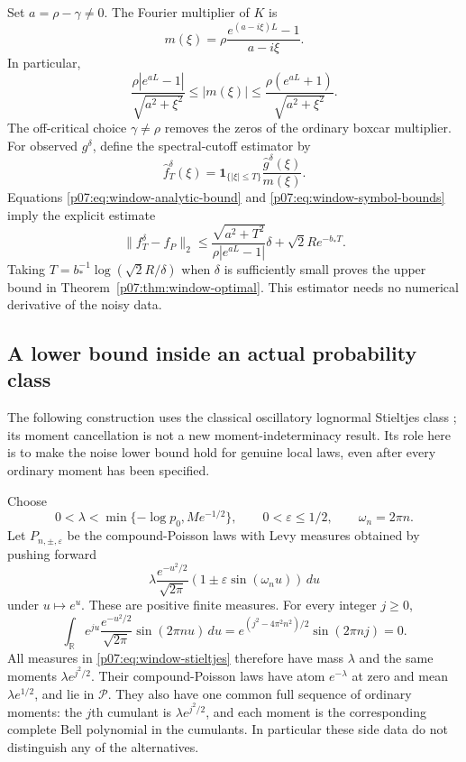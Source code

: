 \documentclass[11pt,letterpaper]{article}
\theoremstyle{definition}
\theoremstyle{remark}
\newcommand{\1}{\mathbf 1}
\begin{document}
Set $a=\rho-\gamma\ne0$.  The Fourier multiplier of $K$ is
\begin{equation}\label{p07:eq:window-symbol}
 m(\xi)=\rho\frac{e^{(a-i\xi)L}-1}{a-i\xi}.
\end{equation}
In particular,
\begin{equation}\label{p07:eq:window-symbol-bounds}
 \frac{\rho|e^{aL}-1|}{\sqrt{a^2+\xi^2}}
 \le |m(\xi)|\le
 \frac{\rho(e^{aL}+1)}{\sqrt{a^2+\xi^2}}.
\end{equation}
The off-critical choice $\gamma\ne\rho$ removes the zeros of the
ordinary boxcar multiplier.  For observed $g^\delta$, define the
spectral-cutoff estimator by
\[
 \widehat f_T^\delta(\xi)=
 \mathbf1_{\{|\xi|\le T\}}\frac{\widehat g^\delta(\xi)}{m(\xi)}.
\]
Equations \eqref{p07:eq:window-analytic-bound} and
\eqref{p07:eq:window-symbol-bounds} imply the explicit estimate
\begin{equation}\label{p07:eq:window-cutoff-error}
 \|f_T^\delta-f_P\|_2\le
 \frac{\sqrt{a^2+T^2}}{\rho|e^{aL}-1|}\delta
                        +\sqrt2R e^{-b_*T}.
\end{equation}
Taking $T=b_*^{-1}\log(\sqrt2R/\delta)$ when $\delta$ is sufficiently
small proves the upper bound in Theorem~\ref{p07:thm:window-optimal}.
This estimator needs no numerical derivative of the noisy data.

\subsection{A lower bound inside an actual probability class}

The following construction uses the classical oscillatory
lognormal Stieltjes class \cite{Stoyanov2004,Kleiber2013}; its moment
cancellation is not a new
moment-indeterminacy result.  Its role here is to make the noise
lower bound hold for genuine local laws, even after every ordinary
moment has been specified.

Choose
\[
 0<\lambda<\min\{-\log p_0,Me^{-1/2}\},\qquad
 0<\varepsilon\le1/2,\qquad \omega_n=2\pi n.
\]
Let $P_{n,\pm,\varepsilon}$ be the compound-Poisson laws with Levy
measures obtained by pushing forward
\begin{equation}\label{p07:eq:window-stieltjes}
 \lambda\frac{e^{-u^2/2}}{\sqrt{2\pi}}
                    (1\pm\varepsilon\sin(\omega_n u))\,du
\end{equation}
under $u\mapsto e^u$.  These are positive finite measures.  For every
integer $j\ge0$,
\begin{equation}\label{p07:eq:window-moment-cancel}
 \int_{\mathbb R}e^{ju}\frac{e^{-u^2/2}}{\sqrt{2\pi}}
                     \sin(2\pi n u)\,du
 =e^{(j^2-4\pi^2n^2)/2}\sin(2\pi nj)=0.
\end{equation}
All measures in \eqref{p07:eq:window-stieltjes} therefore have mass
$\lambda$ and the same moments $\lambda e^{j^2/2}$.  Their
compound-Poisson laws have atom $e^{-\lambda}$ at zero and mean
$\lambda e^{1/2}$, and lie in $\mathcal P$.  They also have one common
full sequence of ordinary moments: the $j$th cumulant is
$\lambda e^{j^2/2}$, and each moment is the corresponding complete
Bell polynomial in the cumulants.  In particular these side data
do not distinguish any of the alternatives.
\end{document}
